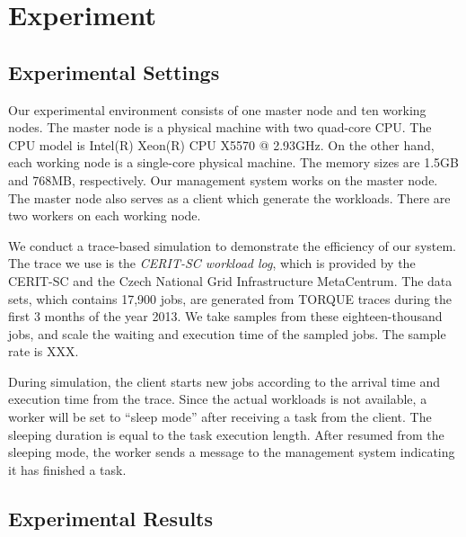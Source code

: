 \section{Experiment}\label{sec:exp}

\subsection{Experimental Settings}

Our experimental environment consists of one master node and ten working nodes.
The master node is a physical machine with two quad-core CPU.
The CPU model is Intel(R) Xeon(R) CPU X5570 @ 2.93GHz.
On the other hand, each working node is a single-core physical machine.
The memory sizes are 1.5GB and 768MB, respectively.
Our management system works on the master node.
The master node also serves as a client which generate the workloads.
There are two workers on each working node.

We conduct a trace-based simulation to demonstrate the efficiency of our system.
The trace we use is the {\em CERIT-SC workload log}, which is provided by the CERIT-SC and the Czech National Grid Infrastructure MetaCentrum.
The data sets, which contains 17,900 jobs, are generated from TORQUE traces during the first 3 months of the year 2013.
We take samples from these eighteen-thousand jobs, and scale the waiting and execution time of the sampled jobs.
The sample rate is XXX.

During simulation, the client starts new jobs according to the arrival time and execution time from the trace.
Since the actual workloads is not available, a worker will be set to ``sleep mode'' after receiving a task from the client.
The sleeping duration is equal to the task execution length.
After resumed from the sleeping mode, the worker sends a message to the management system indicating it has finished a task.


\subsection{Experimental Results}



